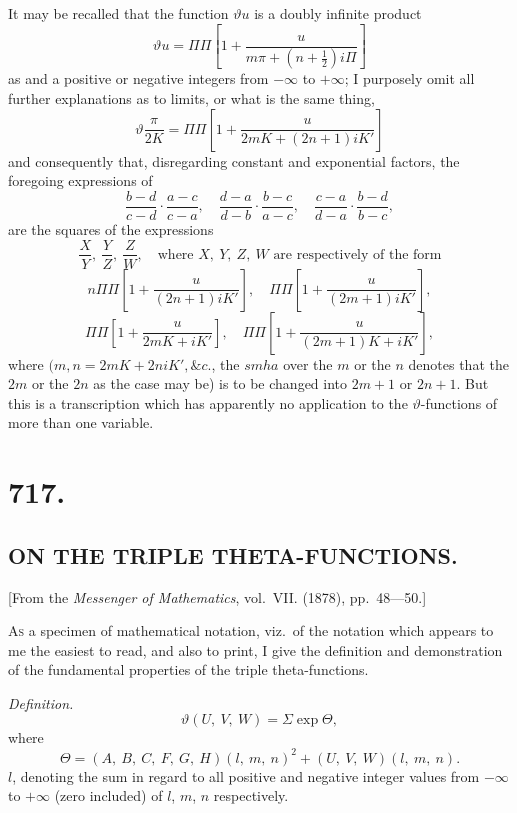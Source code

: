 \documentclass[11pt,a4paper]{book}
\begin{document}
It may be recalled that the function $\vartheta u$ is a doubly infinite product
\[
\vartheta u=\Pi\Pi\left[1+\frac{u}{m\pi+(n+\frac{1}{2})i\Pi}\right]
\]
as and a positive or negative integers from $-\infty$ to $+\infty$; I purposely omit all further explanations as to limits, or what is the same thing,
\[
\vartheta\frac{\pi}{2K}=\Pi\Pi\left[1+\frac{u}{2mK+(2n+1)iK'}\right]
\]
and consequently that, disregarding constant and exponential factors, the foregoing expressions of
\[
\frac{b-d}{c-d}\cdot\frac{a-c}{c-a},\quad \frac{d-a}{d-b}\cdot\frac{b-c}{a-c},\quad \frac{c-a}{d-a}\cdot\frac{b-d}{b-c},
\]
are the squares of the expressions
\[
\frac{X}{Y},\ \frac{Y}{Z},\ \frac{Z}{W},\quad \text{where } X,\ Y,\ Z,\ W \text{ are respectively of the form}
\]
\[
n\Pi\Pi\left[1+\frac{u}{(2n+1)iK'}\right],\quad \Pi\Pi\left[1+\frac{u}{(2m+1)iK'}\right],
\]
\[
\Pi\Pi\left[1+\frac{u}{2mK+iK'}\right],\quad \Pi\Pi\left[1+\frac{u}{(2m+1)K+iK'}\right],
\]
where $(m, n=2mK+2niK', \&c.$, the $smha$ over the $m$ or the $n$ denotes that the $2m$ or the $2n$ as the case may be) is to be changed into $2m+1$ or $2n+1$. But this is a transcription which has apparently no application to the $\vartheta$-functions of more than one variable.

\newpage
\section*{717.}
\subsection*{ON THE TRIPLE THETA-FUNCTIONS.}

\begin{center}
\small [From the \textit{Messenger of Mathematics}, vol.~VII. (1878), pp.~48---50.]
\end{center}

\medskip

\textsc{As} a specimen of mathematical notation, viz.\ of the notation which appears to me the easiest to read, and also to print, I give the definition and demonstration of the fundamental properties of the triple theta-functions.

\textit{Definition.}
\[
\vartheta(U,\ V,\ W)=\Sigma\exp\Theta,
\]
where
\[
\Theta=(A,\ B,\ C,\ F,\ G,\ H)(l,\ m,\ n)^2+(U,\ V,\ W)(l,\ m,\ n).
\]
$l$, denoting the sum in regard to all positive and negative integer values from $-\infty$ to $+\infty$ (zero included) of $l$, $m$, $n$ respectively.
\end{document}
